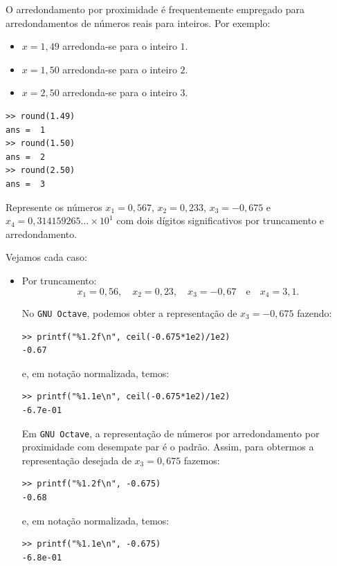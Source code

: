 \begin{obs}
  O arredondamento por proximidade é frequentemente empregado para arredondamentos de números reais para inteiros. Por exemplo:
  \begin{itemize}
  \item $x=1,49$ arredonda-se para o inteiro $1$.
  \item $x=1,50$ arredonda-se para o inteiro $2$.
  \item $x=2,50$ arredonda-se para o inteiro $3$.
  \end{itemize}

\begin{verbatim}
>> round(1.49)
ans =  1
>> round(1.50)
ans =  2
>> round(2.50)
ans =  3
\end{verbatim}

\end{obs}

\begin{ex} Represente os números $x_1 = 0,567$, $x_2 = 0,233$, $x_3 = -0,675$ e $x_4 = 0,314159265 \ldots \times 10^1$ com dois dígitos significativos por truncamento e arredondamento.
\end{ex}
\begin{sol} Vejamos cada caso:
  \begin{itemize}
  \item Por truncamento:
    \begin{equation}
      x_1=0,56,\quad x_2=0,23,\quad x_3=-0,67\quad\mbox{e}\quad x_4 = 3,1.
    \end{equation}

No \verb+GNU Octave+, podemos obter a representação de $x_3 = -0,675$ fazendo:
\begin{verbatim}
>> printf("%1.2f\n", ceil(-0.675*1e2)/1e2)
-0.67
\end{verbatim}
e, em notação normalizada, temos:
\begin{verbatim}
>> printf("%1.1e\n", ceil(-0.675*1e2)/1e2)
-6.7e-01
\end{verbatim}

Em \verb+GNU Octave+, a representação de números por arredondamento por proximidade com desempate par é o padrão. Assim, para obtermos a representação desejada de $x_3 = 0,675$ fazemos:
\begin{verbatim}
>> printf("%1.2f\n", -0.675)
-0.68
\end{verbatim}
e, em notação normalizada, temos:
\begin{verbatim}
>> printf("%1.1e\n", -0.675)
-6.8e-01
\end{verbatim}

  \end{itemize}
\end{sol}


